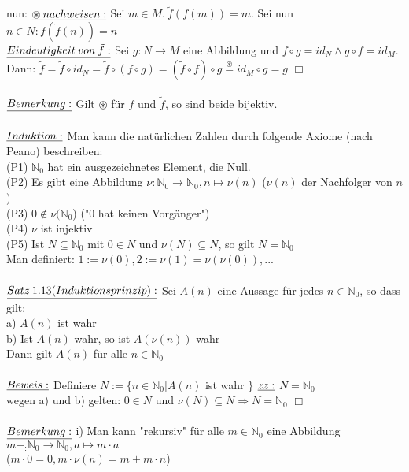 \documentclass[fleqn, a4paper, 11pt]{article}
\begin{document}
nun: $\uline{\circledast\:nachweisen:}$ Sei $m\in M.\:\tilde{f}(f(m))=m$. Sei nun $n\in N:f(\tilde{f}(n))=n$\\
$\uline{Eindeutigkeit\:von\:\tilde{f}:}$ Sei $g:N\rightarrow M$ eine Abbildung und $f\circ g=id_{N}\wedge g\circ f=id_{M}$. Dann: $\tilde{f}=\tilde{f}\circ id_{N}=\tilde{f}\circ(f\circ g)=(\tilde{f}\circ f)\circ g \stackrel{\circledast}{=} id_{M}\circ g=g$ \hfill $\Box$\\
\\
$\uline{Bemerkung:}$ Gilt $\circledast$ f\"ur $f$ und $\tilde{f}$, so sind beide bijektiv.\\
\\
$\uline{Induktion:}$ Man kann die nat\"urlichen Zahlen durch folgende Axiome (nach Peano) beschreiben:\\
(P1) $\mathbb{N}_{0}$ hat ein ausgezeichnetes Element, die Null.\\
(P2) Es gibt eine Abbildung $\nu:\mathbb{N}_{0}\rightarrow\mathbb{N}_{0},n\mapsto\nu(n)$ ($\nu(n)$ der Nachfolger von $n$)\\
(P3) $0\notin\nu(\mathbb{N}_{0}$) ("$0$ hat keinen Vorg\"anger")\\
(P4) $\nu$ ist injektiv\\
(P5) Ist $N\subseteq\mathbb{N}_{0}$ mit $0\in N$ und $\nu(N)\subseteq N$, so gilt $N=\mathbb{N}_{0}$\\
Man definiert: $1:=\nu(0), 2:=\nu(1)=\nu(\nu(0)),...$\\
\\
$\uline{Satz\:1.13(Induktionsprinzip):}$ Sei $A(n)$ eine Aussage f\"ur jedes $n\in\mathbb{N}_{0}$, so dass gilt:\\
a) $A(n)$ ist wahr\\
b) Ist $A(n)$ wahr, so ist $A(\nu(n))$ wahr\\
Dann gilt $A(n)$ f\"ur alle $n\in\mathbb{N}_{0}$\\
\\ 
$\uline{Beweis:}$ Definiere $N:=\{n\in\mathbb{N}_{0}|A(n)$ ist wahr $\}$ $\uline{zz:}$ $N=\mathbb{N}_{0}$\\
wegen a) und b) gelten: $0\in N$ und $\nu(N)\subseteq N\Rightarrow N=\mathbb{N}_{0}$ \hfill $\Box$\\
\\
$\uline{Bemerkung:}$ i) Man kann "rekursiv" f\"ur alle $m\in\mathbb{N}_{0}$ eine Abbildung $m+_:\mathbb{N}_{0}\rightarrow\mathbb{N}_{0}, a\mapsto m\cdot a$\\
($m\cdot 0=0, m\cdot\nu(n)=m+m\cdot n$)\\
\end{document}
